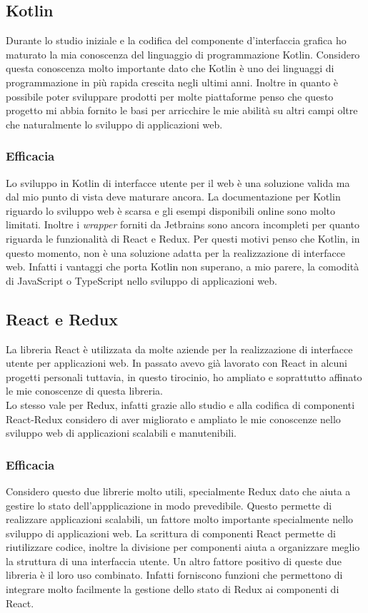 \subsection{Kotlin}
Durante lo studio iniziale e la codifica del componente d'interfaccia grafica ho maturato la mia conoscenza del linguaggio di programmazione Kotlin. Considero questa conoscenza molto importante dato che Kotlin è uno dei linguaggi di programmazione in più rapida crescita negli ultimi anni. Inoltre in quanto è possibile poter sviluppare prodotti per molte piattaforme penso che questo progetto mi abbia fornito le basi per arricchire le mie abilità su altri campi oltre che naturalmente lo sviluppo di applicazioni web.

\subsubsection*{Efficacia}
Lo sviluppo in Kotlin di interfacce utente per il web è una soluzione valida ma dal mio punto di vista deve maturare ancora. La documentazione per Kotlin riguardo lo sviluppo web è scarsa e gli esempi disponibili online sono molto limitati. Inoltre i \emph{wrapper} forniti da Jetbrains sono ancora incompleti per quanto riguarda le funzionalità di React e Redux. Per questi motivi penso che Kotlin, in questo momento, non è una soluzione adatta per la realizzazione di interfacce web. Infatti i vantaggi che porta Kotlin non superano, a mio parere, la comodità di JavaScript o TypeScript nello sviluppo di applicazioni web.

\subsection{React e Redux}
La libreria React è utilizzata da molte aziende per la realizzazione di interfacce utente per applicazioni web. In passato avevo già lavorato con React in alcuni progetti personali tuttavia, in questo tirocinio, ho ampliato e soprattutto affinato le mie conoscenze di questa libreria. \\
Lo stesso vale per Redux, infatti grazie allo studio e alla codifica di componenti React-Redux considero di aver migliorato e ampliato le mie conoscenze nello sviluppo web di applicazioni scalabili e manutenibili.

\subsubsection*{Efficacia}
Considero questo due librerie molto utili, specialmente Redux dato che aiuta a gestire lo stato dell'appplicazione in modo prevedibile. Questo permette di realizzare applicazioni scalabili, un fattore molto importante specialmente nello sviluppo di applicazioni web. La scrittura di componenti React permette di riutilizzare codice, inoltre la divisione per componenti aiuta a organizzare meglio la struttura di una interfaccia utente. Un altro fattore positivo di queste due libreria è il loro uso combinato. Infatti forniscono funzioni che permettono di integrare molto facilmente la gestione dello stato di Redux ai componenti di React.

